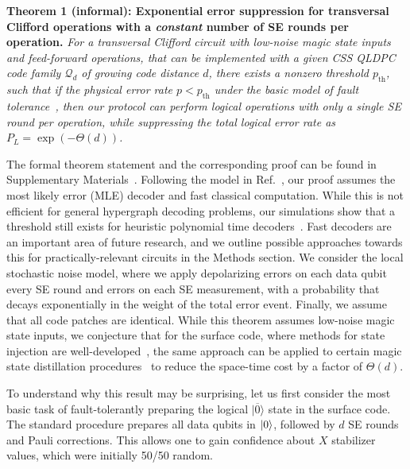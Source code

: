 \documentclass[prl,twocolumn,superscriptaddress,secnumarabic,balancelastpage,amsmath,amssymb]{revtex4-2}
\newcommand{\lket}[1]{|{\overline{#1}}\rangle}
\begin{document}
\textbf{Theorem 1 (informal): Exponential error suppression for transversal Clifford operations with a \textit{constant} number of SE rounds per operation.}
%
\textit{For a transversal Clifford circuit with low-noise magic state inputs and feed-forward operations, that can be implemented with a given CSS QLDPC code family $\mathcal{Q}_d$ of growing code distance $d$, there exists a nonzero threshold $p_\mathrm{th}$, such that if the physical error rate $p<p_\mathrm{th}$ under the basic model of fault tolerance~\cite{gottesman2013fault}, then our protocol can perform logical operations with only a single SE round per operation, while suppressing the total logical error rate as $P_L=\exp(-\Theta(d))$.}

The formal theorem statement and the corresponding proof can be found in Supplementary Materials~\cite{SM}.
%
Following the model in Ref.~\cite{gottesman2013fault}, our proof assumes the most likely error (MLE) decoder and fast classical computation.
%
While this is not efficient for general hypergraph decoding problems, our simulations show that a threshold still exists for heuristic polynomial time decoders~\cite{SM}.
%
Fast decoders are an important area of future research, and we outline possible approaches towards this for practically-relevant circuits in the Methods section.
%
We consider the local stochastic noise model, where we apply depolarizing errors on each data qubit every SE round and errors on each SE measurement, with a probability that decays exponentially in the weight of the total error event.
%
Finally, we assume that all code patches are identical.
%
While this theorem assumes low-noise magic state inputs, we conjecture that for the surface code, where methods for state injection are well-developed~\cite{li2015magic,lao2022magic,gidney2023cleaner}, the same approach can be applied to certain magic state distillation procedures~\cite{bravyi2005universal} to reduce the space-time cost by a factor of $\Theta(d)$.

To understand why this result may be surprising, let us first consider the most basic task of fault-tolerantly preparing the logical $\lket{0}$ state in the surface code.
%
The standard procedure prepares all data qubits in $\ket{0}$, followed by $d$ SE rounds and Pauli corrections.
%
This allows one to gain confidence about $X$ stabilizer values, which were initially 50/50 random.
\end{document}

